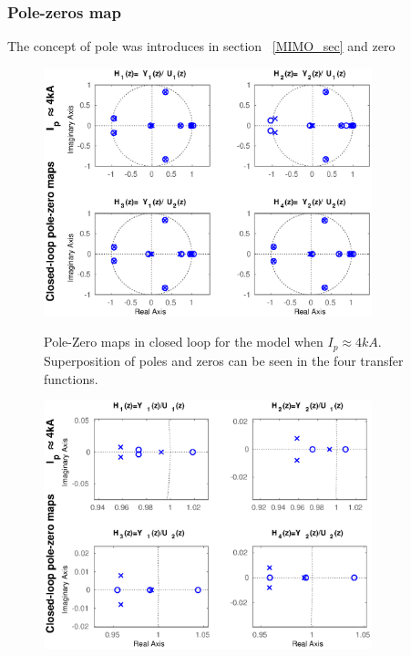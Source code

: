 \subsubsection{Pole-zeros map}

The concept of pole was introduces in section ~\ref{MIMO_sec} and zero 


\begin{figure}
	\centering
	\includegraphics[width=0.85\textwidth]{Chp5/PoleZero/PoleZeroClosePos.eps}
	\label{PoleZeroClosePos}
	\caption{Pole-Zero maps in closed loop for the model when $I_p\approx 4 kA$. Superposition  of poles and zeros can be seen in the four transfer functions.}
\end{figure}	

\begin{figure}
	\centering
	\includegraphics[width=0.85\textwidth]{Chp5/PoleZero/PoleZeroClosePosZoom.eps}
	\label{PoleZeroClosePosZoom}
\end{figure}	


